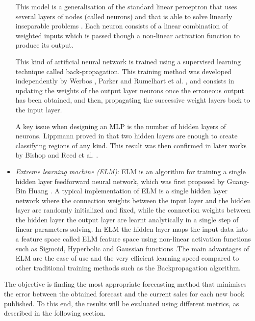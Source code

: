 \documentclass[a4paper,10pt,twocolumn,preprint,3p]{elsarticle}
\begin{document}
\begin{itemize}
This model is a generalisation of the standard linear perceptron that uses several layers of nodes (called neurons) and that is able to solve linearly inseparable problems \cite{SteinwenderBitzer2003}.
Each neuron consists of a linear combination of weighted inputs which is passed 
though a non-linear activation function to produce its output.

This kind of artificial neural network is trained using a supervised learning 
technique called back-propagation.
This training method was developed independently by Werbos \cite{Werbos1974}, 
Parker \cite{Parker1985} and Rumelhart et al. \cite{Rumelhart1985}, and consists
in updating the weights of the output layer neurons once the erroneous output 
has been obtained, and then, propagating the successive weight layers back to 
the input layer.

A key issue when designing an MLP is the number of hidden layers of neurons.
Lippmann proved in \cite{Lippmann1987} that two hidden layers are enough to 
create classifying regions of any kind. This result was then confirmed in later 
works by Bishop \cite{Bishop1996} and Reed et al. \cite{Reed1999}.

\item \emph{Extreme learning machine (ELM)}: 
ELM is an algorithm for training a single hidden 
layer feedforward neural network, which was first proposed by Guang-Bin Huang \cite
{huang2006extreme}. A typical implementation of ELM is a single hidden layer network where the 
connection weights between the input layer and the hidden layer are randomly initialized and 
fixed, while the connection weights between the hidden layer the output layer are learnt 
analytically in a single step of linear parameters solving. In ELM the hidden layer maps the 
input data into a feature space called ELM feature space using non-linear activation functions 
such as Sigmoid, Hyperbolic and Gaussian functions \cite{huang2015trends}.The main advantages 
of ELM are the ease of use and the very efficient learning speed compared to other traditional 
training methods such as the Backpropagation algorithm. 

\end{itemize}

The objective is finding the most appropriate forecasting method that minimises 
the error between the obtained forecast and the current sales for each new book 
published. To this end, the results will be evaluated using different metrics, as described in the following section.
\end{document}
